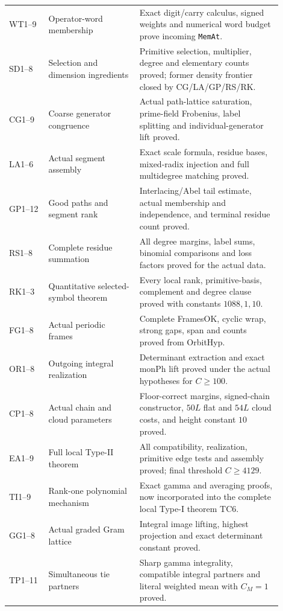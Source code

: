 \documentclass[11pt,a4paper]{article}
\numberwithin{equation}{section}
\theoremstyle{remark}\newtheorem{remark}[theorem]{Remark}
\begin{document}
\begin{longtable}{>{\raggedright\arraybackslash}p{0.13\linewidth}>{\raggedright\arraybackslash}p{0.30\linewidth}>{\raggedright\arraybackslash}p{0.47\linewidth}}
WT1--9 & Operator-word membership & Exact digit/carry calculus, signed weights and numerical word budget prove incoming \texttt{MemAt}.\\[3pt]
SD1--8 & Selection and dimension ingredients & Primitive selection, multiplier, degree and elementary counts proved; former density frontier closed by CG/LA/GP/RS/RK.\\[3pt]
CG1--9 & Coarse generator congruence & Actual path-lattice saturation, prime-field Frobenius, label splitting and individual-generator lift proved.\\[3pt]
LA1--6 & Actual segment assembly & Exact scale formula, residue bases, mixed-radix injection and full multidegree matching proved.\\[3pt]
GP1--12 & Good paths and segment rank & Interlacing/Abel tail estimate, actual membership and independence, and terminal residue count proved.\\[3pt]
RS1--8 & Complete residue summation & All degree margins, label sums, binomial comparisons and loss factors proved for the actual data.\\[3pt]
RK1--3 & Quantitative selected-symbol theorem & Every local rank, primitive-basis, complement and degree clause proved with constants $1088,1,10$.\\[3pt]
FG1--8 & Actual periodic frames & Complete FramesOK, cyclic wrap, strong gaps, span and counts proved from OrbitHyp.\\[3pt]
OR1--8 & Outgoing integral realization & Determinant extraction and exact monPh lift proved under the actual hypotheses for $C\ge100$.\\[3pt]
CP1--8 & Actual chain and cloud parameters & Floor-correct margins, signed-chain constructor, $50L$ flat and $54L$ cloud costs, and height constant $10$ proved.\\[3pt]
EA1--9 & Full local Type-II theorem & All compatibility, realization, primitive edge tests and assembly proved; final threshold $C\ge4129$.\\[3pt]
TI1--9 & Rank-one polynomial mechanism & Exact gamma and averaging proofs, now incorporated into the complete local Type-I theorem TC6.\\[3pt]
GG1--8 & Actual graded Gram lattice & Integral image lifting, highest projection and exact determinant constant proved.\\[3pt]
TP1--11 & Simultaneous tie partners & Sharp gamma integrality, compatible integral partners and literal weighted mean with $C_M=1$ proved.\\[3pt]

\end{longtable}
\end{document}
